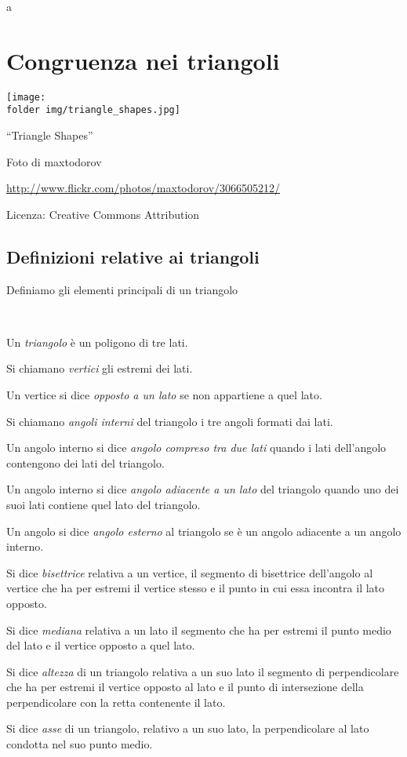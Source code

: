 a%

\chapter{Congruenza nei 
triangoli}\label{chap:congruenza_nei_triangoli}

\texttt{[image: \\folder img/triangle\_shapes.jpg]}
  \begin{center}
    {\large ``Triangle Shapes''}\par
    Foto di maxtodorov\par
    \url{http://www.flickr.com/photos/maxtodorov/3066505212/}\par
    Licenza: Creative Commons Attribution\par
  \end{center}
\newpage

\section{Definizioni relative ai 
triangoli}\label{sect:definizioni_triangoli}

Definiamo gli elementi principali di un triangolo
\begin{definizione}~
\begin{itemize*}
\item Un \emph{triangolo} è un poligono di tre lati.
\item Si chiamano \emph{vertici} gli estremi dei lati.
\item Un vertice si dice \emph{opposto a un lato} se non appartiene a 
quel lato.
\item Si chiamano \emph{angoli interni} del triangolo i tre angoli 
formati dai lati.
\item Un angolo interno si dice \emph{angolo compreso tra due lati} 
quando i lati dell'angolo contengono dei lati del triangolo.
\item Un angolo interno si dice \emph{angolo adiacente a un lato} del 
triangolo quando uno dei suoi lati contiene quel lato del triangolo.
\item Un angolo si dice \emph{angolo esterno} al triangolo se è un 
angolo adiacente a un angolo interno.
\item Si dice \emph{bisettrice} relativa a un vertice, il segmento di 
bisettrice dell'angolo al vertice che ha per estremi il vertice 
stesso e il punto in cui essa incontra il lato opposto.
\item Si dice \emph{mediana} relativa a un lato il segmento che ha 
per estremi il punto medio del lato e il vertice opposto a quel lato.
\item Si dice \emph{altezza} di un triangolo relativa a un suo lato 
il segmento di perpendicolare che ha per estremi il vertice opposto 
al lato e il punto di intersezione della perpendicolare con la retta 
contenente il lato. 
\item Si dice \emph{asse} di un triangolo, relativo a un suo lato, la 
perpendicolare al lato condotta nel suo punto medio.
\end{itemize*}
\end{definizione}

